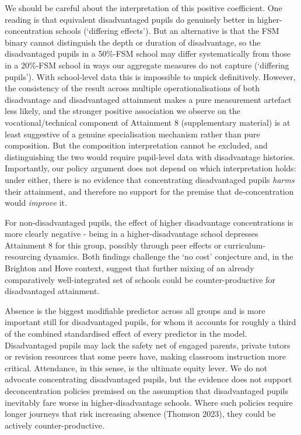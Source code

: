 \documentclass[
  12pt,
  titlepage]{article}
\begin{document}
We should be careful about the interpretation of this positive
coefficient. One reading is that equivalent disadvantaged pupils do
genuinely better in higher-concentration schools (`differing effects').
But an alternative is that the FSM binary cannot distinguish the depth
or duration of disadvantage, so the disadvantaged pupils in a 50\%-FSM
school may differ systematically from those in a 20\%-FSM school in ways
our aggregate measures do not capture (`differing pupils'). With
school-level data this is impossible to unpick definitively. However,
the consistency of the result across multiple operationalisations of
both disadvantage and disadvantaged attainment makes a pure measurement
artefact less likely, and the stronger positive association we observe
on the vocational/technical component of Attainment 8 (supplementary
material) is at least suggestive of a genuine specialisation mechanism
rather than pure composition. But the composition interpretation cannot
be excluded, and distinguishing the two would require pupil-level data
with disadvantage histories. Importantly, our policy argument does not
depend on which interpretation holds: under either, there is no evidence
that concentrating disadvantaged pupils \emph{harms} their attainment,
and therefore no support for the premise that de-concentration would
\emph{improve} it.

For non-disadvantaged pupils, the effect of higher disadvantage
concentrations is more clearly negative - being in a higher-disadvantage
school depresses Attainment 8 for this group, possibly through peer
effects or curriculum-resourcing dynamics. Both findings challenge the
`no cost' conjecture and, in the Brighton and Hove context, suggest that
further mixing of an already comparatively well-integrated set of
schools could be counter-productive for disadvantaged attainment.

Absence is the biggest modifiable predictor across all groups and is
more important still for disadvantaged pupils, for whom it accounts for
roughly a third of the combined standardised effect of every predictor
in the model. Disadvantaged pupils may lack the safety net of engaged
parents, private tutors or revision resources that some peers have,
making classroom instruction more critical. Attendance, in this sense,
is the ultimate equity lever. We do not advocate concentrating
disadvantaged pupils, but the evidence does not support deconcentration
policies premised on the assumption that disadvantaged pupils inevitably
fare worse in higher-disadvantage schools. Where such policies require
longer journeys that risk increasing absence (Thomson 2023), they could
be actively counter-productive.
\end{document}
